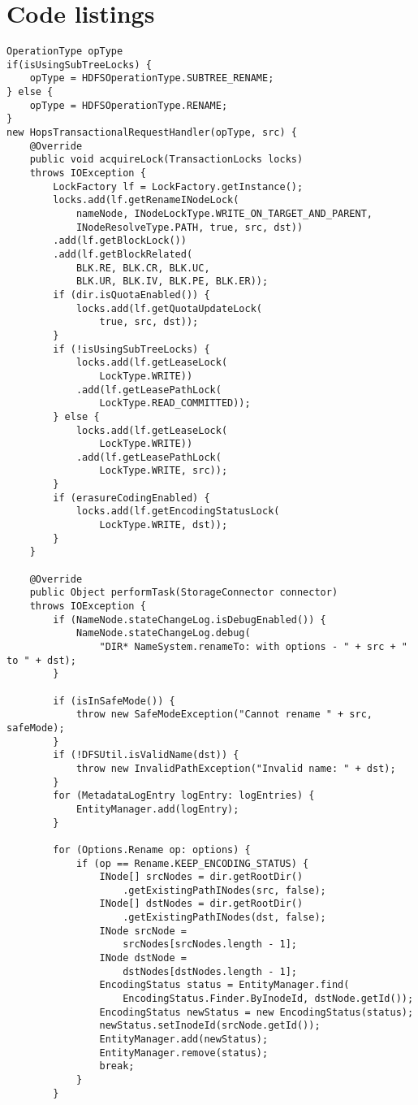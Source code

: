 \section{Code listings}

\begin{lstlisting}[label={lst:trh}, caption={Transactional request handler for the rename operation}]
OperationType opType
if(isUsingSubTreeLocks) {
    opType = HDFSOperationType.SUBTREE_RENAME;
} else {
    opType = HDFSOperationType.RENAME;
}
new HopsTransactionalRequestHandler(opType, src) {
    @Override
    public void acquireLock(TransactionLocks locks)
    throws IOException {
        LockFactory lf = LockFactory.getInstance();
        locks.add(lf.getRenameINodeLock(
            nameNode, INodeLockType.WRITE_ON_TARGET_AND_PARENT,
            INodeResolveType.PATH, true, src, dst))
        .add(lf.getBlockLock())
        .add(lf.getBlockRelated(
            BLK.RE, BLK.CR, BLK.UC,
            BLK.UR, BLK.IV, BLK.PE, BLK.ER));
        if (dir.isQuotaEnabled()) {
            locks.add(lf.getQuotaUpdateLock(
                true, src, dst));
        }
        if (!isUsingSubTreeLocks) {
            locks.add(lf.getLeaseLock(
                LockType.WRITE))
            .add(lf.getLeasePathLock(
                LockType.READ_COMMITTED));
        } else {
            locks.add(lf.getLeaseLock(
                LockType.WRITE))
            .add(lf.getLeasePathLock(
                LockType.WRITE, src));
        }
        if (erasureCodingEnabled) {
            locks.add(lf.getEncodingStatusLock(
                LockType.WRITE, dst));
        }
    }

    @Override
    public Object performTask(StorageConnector connector)
    throws IOException {
        if (NameNode.stateChangeLog.isDebugEnabled()) {
            NameNode.stateChangeLog.debug(
                "DIR* NameSystem.renameTo: with options - " + src + " to " + dst);
        }

        if (isInSafeMode()) {
            throw new SafeModeException("Cannot rename " + src, safeMode);
        }
        if (!DFSUtil.isValidName(dst)) {
            throw new InvalidPathException("Invalid name: " + dst);
        }
        for (MetadataLogEntry logEntry: logEntries) {
            EntityManager.add(logEntry);
        }

        for (Options.Rename op: options) {
            if (op == Rename.KEEP_ENCODING_STATUS) {
                INode[] srcNodes = dir.getRootDir()
                    .getExistingPathINodes(src, false);
                INode[] dstNodes = dir.getRootDir()
                    .getExistingPathINodes(dst, false);
                INode srcNode = 
                    srcNodes[srcNodes.length - 1];
                INode dstNode = 
                    dstNodes[dstNodes.length - 1];
                EncodingStatus status = EntityManager.find(
                    EncodingStatus.Finder.ByInodeId, dstNode.getId());
                EncodingStatus newStatus = new EncodingStatus(status);
                newStatus.setInodeId(srcNode.getId());
                EntityManager.add(newStatus);
                EntityManager.remove(status);
                break;
            }
        }


\end{lstlisting}
